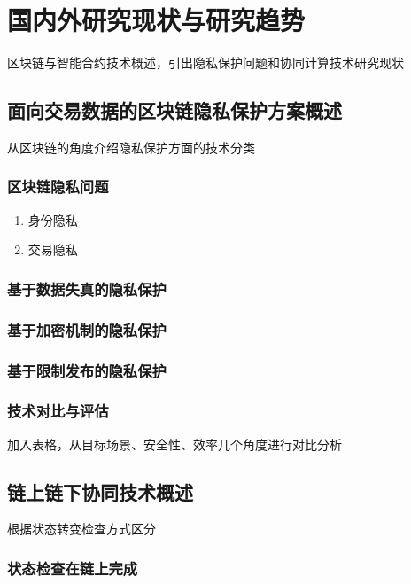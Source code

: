 \chapter{国内外研究现状与研究趋势}

区块链与智能合约技术概述，引出隐私保护问题和协同计算技术研究现状

\section{面向交易数据的区块链隐私保护方案概述}

从区块链的角度介绍隐私保护方面的技术分类

\subsection{区块链隐私问题}

\begin{enumerate}
    \item 身份隐私
    \item 交易隐私
\end{enumerate}

\subsection{基于数据失真的隐私保护}

\subsection{基于加密机制的隐私保护}

\subsection{基于限制发布的隐私保护}

\subsection{技术对比与评估}

加入表格，从目标场景、安全性、效率几个角度进行对比分析

\section{链上链下协同技术概述}

根据状态转变检查方式区分

\subsection{状态检查在链上完成}

